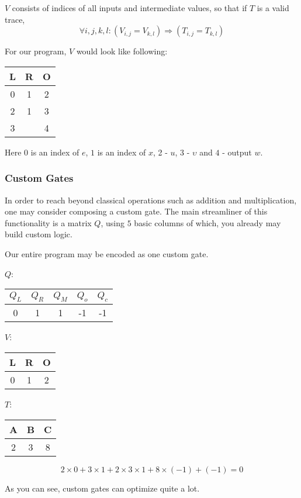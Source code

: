 \documentclass[../lecture-notes.tex]{subfiles}
\begin{document}
\begin{definition}
$V$ consists of indices of all inputs and intermediate values, so that if $T$ is a valid trace,
\[\forall i, j, k, l: (V_{i,j} = V_{k,l}) \Rightarrow (T_{i,j} = T_{k,l})\]
\end{definition}

\begin{example}
For our program, $V$ would look like following:
\begin{center}
\begin{tabular}{|c|c|c|}
\hline
L & R & O \\
\hline
0 & 1 & 2 \\
\hline
2 & 1 & 3 \\
\hline
3 &  & 4 \\
\hline
\end{tabular}
\end{center}
Here $0$ is an index of $e$, $1$ is an index of $x$, 2 - $u$, 3 - $\upsilon$ and $4$ - output $w$.
\end{example}

\subsubsection{Custom Gates}
In order to reach beyond classical operations such as addition and multiplication, one may consider composing a custom gate. The main streamliner of this functionality is a matrix $Q$, using $5$ basic columns of which, you already may build custom logic.

\begin{example}
Our entire program may be encoded as one custom gate.
\begin{center}
$Q$: 
\begin{tabular}{|c|c|c|c|c|}
\hline
$Q_L$ & $Q_R$ & $Q_M$ & $Q_o$ & $Q_c$ \\ 
\hline
0 & 1 & 1 & -1 & -1 \\ 
\hline
\end{tabular}
\quad $V$:
\begin{tabular}{|c|c|c|}
\hline
L & R & O \\
\hline
0 & 1 & 2 \\
\hline
\end{tabular}
\quad $T$:
\begin{tabular}{|c|c|c|}
\hline
A & B & C \\
\hline
2 & 3 & 8 \\
\hline
\end{tabular}

\[2 \times 0 + 3 \times 1 + 2 \times 3 \times 1 + 8 \times (-1) + (-1) = 0\]
\end{center}
As you can see, custom gates can optimize quite a lot.
\end{example}
\end{document}
